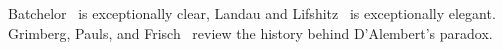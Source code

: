 \begin{node}
\begin{node}[References]\label{fluids:euler-flow-000Q}%
Batchelor~\cite[\S6.4]{batchelor1967introduction} is exceptionally clear,
Landau and Lifshitz~\cite[\S11]{landau1987fluids} is exceptionally elegant.
Grimberg, Pauls, and Frisch~\cite{grimberg2008genesis} review the
history behind D'Alembert's paradox.
\end{node} %
\end{node} %